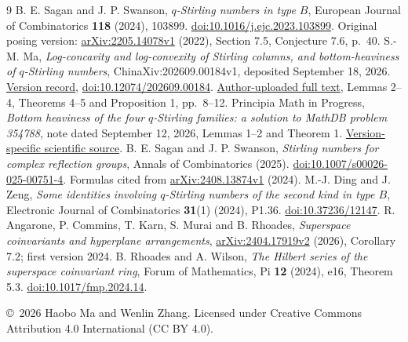 \documentclass[11pt]{article}
\begin{document}
\begin{thebibliography}{9}
B. E. Sagan and J. P. Swanson,
\emph{$q$-Stirling numbers in type $B$},
European Journal of Combinatorics \textbf{118} (2024), 103899.
\href{https://doi.org/10.1016/j.ejc.2023.103899}{doi:10.1016/j.ejc.2023.103899}.
Original posing version:
\href{https://arxiv.org/abs/2205.14078v1}{arXiv:2205.14078v1} (2022),
Section 7.5, Conjecture 7.6, p.~40.
S.-M. Ma,
\emph{Log-concavity and log-convexity of Stirling columns, and
bottom-heaviness of $q$-Stirling numbers},
ChinaXiv:202609.00184v1, deposited September 18, 2026.
\href{https://chinaxiv.org/abs/202609.00184v1}{Version record},
\href{https://doi.org/10.12074/202609.00184}{doi:10.12074/202609.00184}.
\href{https://www.researchgate.net/publication/414355049_Log-concavity_and_log-convexity_of_Stirling_columns_and_bottom-heaviness_of_q-Stirling_numbers}{Author-uploaded full text},
Lemmas 2--4, Theorems 4--5 and Proposition 1, pp.~8--12.
Principia Math in Progress,
\emph{Bottom heaviness of the four $q$-Stirling families:
a solution to MathDB problem 354788},
note dated September 12, 2026, Lemmas 1--2 and Theorem 1.
\href{https://github.com/PrincipiaMathOrg/math-solutions/blob/47371706c400c79d06e3fb62190fcf6f7a725c85/site-backup/mathdb-354788/mathdb-354788-solution.tex}{Version-specific scientific source}.
B. E. Sagan and J. P. Swanson,
\emph{Stirling numbers for complex reflection groups},
Annals of Combinatorics (2025).
\href{https://doi.org/10.1007/s00026-025-00751-4}{doi:10.1007/s00026-025-00751-4}.
Formulas cited from
\href{https://arxiv.org/abs/2408.13874v1}{arXiv:2408.13874v1} (2024).
M.-J. Ding and J. Zeng,
\emph{Some identities involving $q$-Stirling numbers of the second kind in type $B$},
Electronic Journal of Combinatorics \textbf{31}(1) (2024), P1.36.
\href{https://doi.org/10.37236/12147}{doi:10.37236/12147}.
R. Angarone, P. Commins, T. Karn, S. Murai and B. Rhoades,
\emph{Superspace coinvariants and hyperplane arrangements},
\href{https://arxiv.org/abs/2404.17919v2}{arXiv:2404.17919v2} (2026),
Corollary 7.2; first version 2024.
B. Rhoades and A. Wilson,
\emph{The Hilbert series of the superspace coinvariant ring},
Forum of Mathematics, Pi \textbf{12} (2024), e16, Theorem 5.3.
\href{https://doi.org/10.1017/fmp.2024.14}{doi:10.1017/fmp.2024.14}.
\end{thebibliography}
\medskip\noindent\small
\copyright\ 2026 Haobo Ma and Wenlin Zhang.
Licensed under Creative Commons Attribution 4.0 International
(CC BY 4.0).
\end{document}

